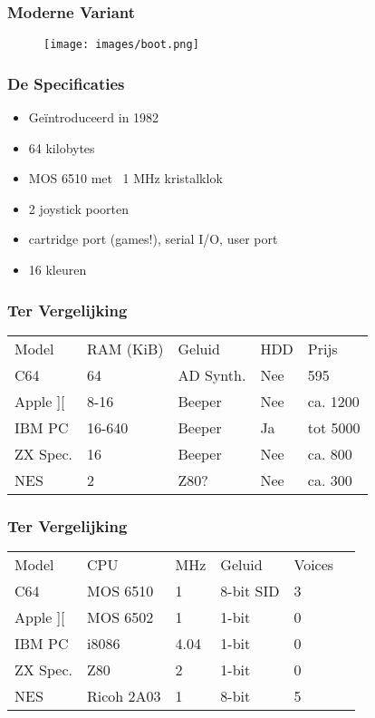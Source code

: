 \documentclass[aspectratio=43]{uva-inf-presentation}
\begin{document}
\begin{frame}
\frametitle{Moderne Variant}

\begin{figure}
\texttt{[image: images/boot.png]}
\end{figure}

\end{frame}


\begin{frame}
\frametitle{De Specificaties}

\begin{itemize}
\item Ge\"introduceerd in 1982
\item 64 kilobytes
\item MOS 6510 met ~1 MHz kristalklok
\item 2 joystick poorten
\item cartridge port (games!), serial I/O, user port
\item 16 kleuren
\end{itemize}

\end{frame}


\begin{frame}
\frametitle{Ter Vergelijking}

\begin{tabular}{|l|l|l|l|l|}
\hline Model & RAM (KiB) & Geluid & HDD & Prijs \\
C64 & 64 & AD Synth. & Nee & 595 \\
Apple ][ & 8-16 & Beeper & Nee & ca. 1200 \\
IBM PC & 16-640 & Beeper & Ja & tot 5000 \\
ZX Spec. & 16 & Beeper & Nee & ca. 800 \\ \hline
NES & 2 & Z80? & Nee & ca. 300 \\ \hline
\end{tabular}

\end{frame}


\begin{frame}
\frametitle{Ter Vergelijking}

\begin{tabular}{|l|l|l|l|l|l|}
\hline Model & CPU & MHz & Geluid & Voices \\
C64 & MOS 6510 & 1 & 8-bit SID & 3 \\
Apple ][ & MOS 6502 & 1 & 1-bit & 0 \\
IBM PC & i8086 & 4.04 & 1-bit & 0 \\
ZX Spec. & Z80 & 2 & 1-bit & 0 \\ \hline
NES & Ricoh 2A03 & 1 & 8-bit & 5 \\ \hline
\end{tabular}

\end{frame}
\end{document}
